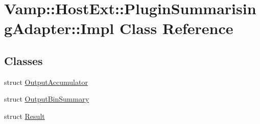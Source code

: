 \hypertarget{class_vamp_1_1_host_ext_1_1_plugin_summarising_adapter_1_1_impl}{}\section{Vamp\+:\+:Host\+Ext\+:\+:Plugin\+Summarising\+Adapter\+:\+:Impl Class Reference}
\label{class_vamp_1_1_host_ext_1_1_plugin_summarising_adapter_1_1_impl}
\subsection*{Classes}
\begin{DoxyCompactItemize}
\item 
struct \hyperlink{struct_vamp_1_1_host_ext_1_1_plugin_summarising_adapter_1_1_impl_1_1_output_accumulator}{Output\+Accumulator}
\item 
struct \hyperlink{struct_vamp_1_1_host_ext_1_1_plugin_summarising_adapter_1_1_impl_1_1_output_bin_summary}{Output\+Bin\+Summary}
\item 
struct \hyperlink{struct_vamp_1_1_host_ext_1_1_plugin_summarising_adapter_1_1_impl_1_1_result}{Result}
\end{DoxyCompactItemize}
